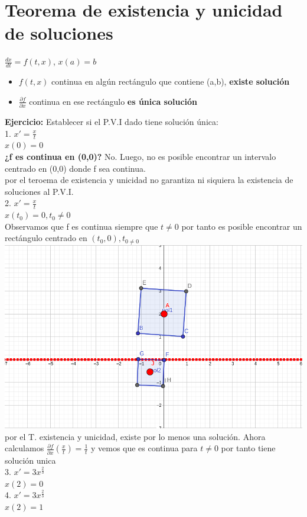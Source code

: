 \documentclass{book}
\begin{document}
    \section{Teorema de existencia y unicidad de soluciones}
    $\frac{dx}{dt} = f(t,x)$, $x(a)=b$
    \begin{itemize}
         \item $f(t,x)$ continua en algún rectángulo que contiene (a,b), \textbf{existe solución}
         \item $\frac{\partial f }{\partial x}$ continua en ese rectángulo \textbf{es única solución}
    \end{itemize}
     \textbf{Ejercicio:} Establecer si el P.V.I dado tiene solución única: \\
     1. $x'= \frac{x}{t} $ \\ $x(0)=0$ \\ \textbf{¿f es continua en (0,0)?} No. Luego, no es posible encontrar un intervalo centrado en (0,0)
    donde f sea continua. \\ 
    por el teroema de existencia y unicidad no garantiza ni siquiera la existencia de soluciones al P.V.I. \\ 
    2. $x'= \frac{x}{t} $ \\ $x(t_{0})=0, t_{0} \not = 0$ \\ 
    Observamos que f es continua siempre que $t \not = 0$ por tanto es posible encontrar un rectángulo centrado 
    en $(t_{0}, 0), t_{0 \not = 0 }$ \\ 
    \includegraphics[scale=0.4]{imagenes/PVI_01.png}\\ 
    por el T. existencia y unicidad, existe por lo menos una solución. 
    Ahora calculamos $\frac{\partial f }{\partial x}(\frac{x}{t})= \frac{1}{t}$ y vemos que es continua para $t \not = 0$ por tanto tiene solución unica
    \\ 
    3.  $x'= 3x^{\frac{2}{3}} $ \\ $x(2)=0$ \\ 
    4. $x'= 3x^{\frac{2}{3}} $ \\ $x(2)=1$ \\ 
\end{document}
